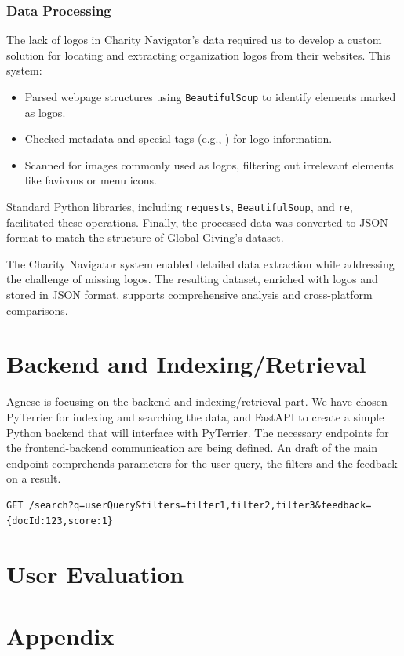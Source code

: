\documentclass[unicode,9pt,a4paper,oneside,numbers=endperiod,openany]{scrartcl}
\begin{document}
\subsubsection{Data Processing}
The lack of logos in Charity Navigator's data required us to develop a custom solution for locating and extracting organization logos from their websites. This system:
\begin{itemize}
\item Parsed webpage structures using \texttt{BeautifulSoup} to identify elements marked as logos.
\item Checked metadata and special tags (e.g., \texttt{}) for logo information.
\item Scanned for images commonly used as logos, filtering out irrelevant elements like favicons or menu icons.
\end{itemize}
Standard Python libraries, including \texttt{requests}, \texttt{BeautifulSoup}, and \texttt{re}, facilitated these operations. Finally, the processed data was converted to JSON format to match the structure of Global Giving's dataset.

The Charity Navigator system enabled detailed data extraction while addressing the challenge of missing logos. The resulting dataset, enriched with logos and stored in JSON format, supports comprehensive analysis and cross-platform comparisons.


\section{Backend and Indexing/Retrieval}
Agnese is focusing on the backend and indexing/retrieval part.
We have chosen PyTerrier for indexing and searching the data, and FastAPI to create a simple Python backend that will interface with PyTerrier.
The necessary endpoints for the frontend-backend communication are being defined.
An draft of the main endpoint comprehends parameters for the user query, the filters and the feedback on a result.
\begin{verbatim}
GET /search?q=userQuery&filters=filter1,filter2,filter3&feedback={docId:123,score:1}
\end{verbatim}

\section{User Evaluation}

\section{Appendix}
\end{document}
